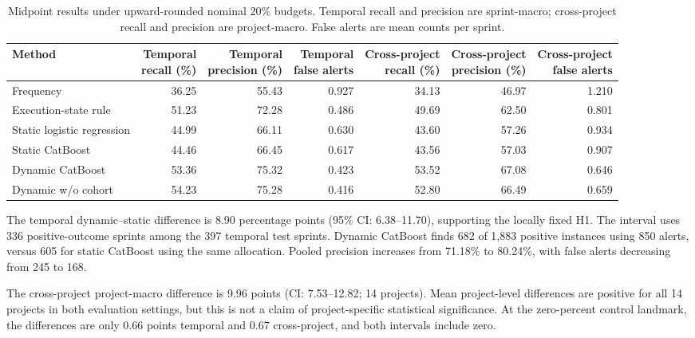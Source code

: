\documentclass[11pt,a4paper]{article}
\begin{document}
{\def\LTcaptype{table}
\begin{table}[htbp]
\centering\footnotesize\setlength{\tabcolsep}{4pt}
\caption{Midpoint results under upward-rounded nominal 20\% budgets. Temporal recall and precision are sprint-macro; cross-project recall and precision are project-macro. False alerts are mean counts per sprint.}\label{tab:02_performance}
\begin{tabular}{@{}lrrrrrr@{}}
\toprule
Method & \shortstack{Temporal\\recall (\%)} & \shortstack{Temporal\\precision (\%)} & \shortstack{Temporal\\false alerts} & \shortstack{Cross-project\\recall (\%)} & \shortstack{Cross-project\\precision (\%)} & \shortstack{Cross-project\\false alerts} \\
\midrule
Frequency & 36.25 & 55.43 & 0.927 & 34.13 & 46.97 & 1.210 \\
Execution-state rule & 51.23 & 72.28 & 0.486 & 49.69 & 62.50 & 0.801 \\
Static logistic regression & 44.99 & 66.11 & 0.630 & 43.60 & 57.26 & 0.934 \\
Static CatBoost & 44.46 & 66.45 & 0.617 & 43.56 & 57.03 & 0.907 \\
Dynamic CatBoost & 53.36 & 75.32 & 0.423 & 53.52 & 67.08 & 0.646 \\
Dynamic w/o cohort & 54.23 & 75.28 & 0.416 & 52.80 & 66.49 & 0.659 \\
\bottomrule
\end{tabular}
\end{table}

}

The temporal dynamic--static difference is 8.90 percentage points (95\% CI: 6.38--11.70), supporting the locally fixed H1. The interval uses 336 positive-outcome sprints among the 397 temporal test sprints. Dynamic CatBoost finds 682 of 1,883 positive instances using 850 alerts, versus 605 for static CatBoost using the same allocation. Pooled precision increases from 71.18\% to 80.24\%, with false alerts decreasing from 245 to 168.

The cross-project project-macro difference is 9.96 points (CI: 7.53--12.82; 14 projects). Mean project-level differences are positive for all 14 projects in both evaluation settings, but this is not a claim of project-specific statistical significance. At the zero-percent control landmark, the differences are only 0.66 points temporal and 0.67 cross-project, and both intervals include zero.
\end{document}
